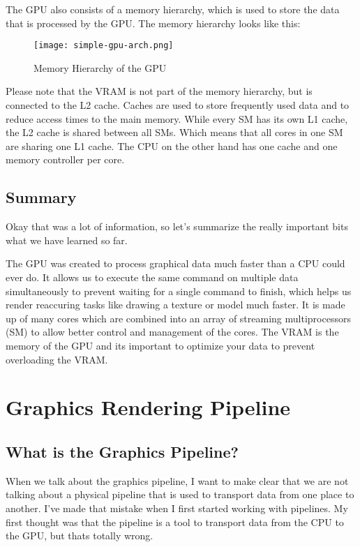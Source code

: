 \documentclass[12pt]{report} \usepackage {preamble}
\begin{document}
The GPU also consists of a memory hierarchy, which is used to store the
data that is processed by the GPU. The memory hierarchy looks like this:

\begin{figure}[hbtp]
	\centering
	\texttt{[image: simple-gpu-arch.png]}
	\caption{Memory Hierarchy of the GPU \cite{fig:gpu-arch}}
\end{figure}

Please note that the VRAM is not part of the memory hierarchy, but is
connected to the L2 cache. Caches are used to store frequently used
data and to reduce access times to the main memory. While every SM
has its own L1 cache, the L2 cache is shared between all SMs. Which
means that all cores in one SM are sharing one L1 cache. The CPU
on the other hand has one cache and one memory controller per
core. \cite{CUDA_Programming_Guide}

\section {Summary}

Okay that was a lot of information, so let's summarize the really
important bits what we have learned so far.

The GPU was created to process graphical data much faster than a CPU
could ever do. It allows us to execute the same command on multiple
data simultaneously to prevent waiting for a single command to finish,
which helps us render reaccuring tasks like drawing a texture or model
much faster.  It is made up of many cores which are combined into an
array of streaming multiprocessors (SM) to allow better control and
management of the cores.  The VRAM is the memory of the GPU and its
important to optimize your data to prevent overloading the VRAM.

\chapter {Graphics Rendering Pipeline}

\section {What is the Graphics Pipeline?}

When we talk about the graphics pipeline, I want to make clear that we
are not talking about a physical pipeline that is used to transport data
from one place to another. I've made that mistake when I first started
working with pipelines. My first thought was that the pipeline is a tool
to transport data from the CPU to the GPU, but thats totally wrong.
\end{document}
